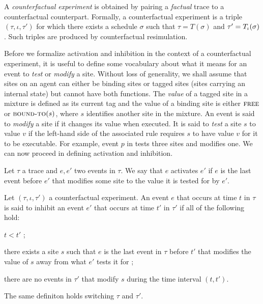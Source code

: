 A \textit{counterfactual experiment} is obtained by pairing a
\emph{factual} trace to a counterfactual counterpart. Formally, a
counterfactual experiment is a triple $(\tau, \iota, \tau')$ for which
there exists a schedule $\sigma$ such that $\tau = T(\sigma)$ and
$\tau' = {T_\iota}{}(\sigma)$. Such triples are produced by
counterfactual resimulation.

Before we formalize activation and inhibition in the context of a
counterfactual experiment, it is useful to define some vocabulary
about what it means for an event to \emph{test} or \emph{modify} a
site. Without loss of generality, we shall assume that sites on an
agent can either be binding sites or tagged sites (sites carrying an
internal state) but cannot have both functions. The \textit{value} of
a tagged site in a mixture is defined as its current tag and the value
of a binding site is either $\textsc{free}$ or $\textsc{bound-to}(s)$,
where $s$ identifies another site in the mixture.  An event is said to
\emph{modify} a site if it changes its value when executed. It is said
to \emph{test} a site $s$ to value $v$ if the left-hand side of the
associated rule requires $s$ to have value $v$ for it to be
executable. For example, event $p$ in \RefTrace{} tests three sites
and modifies one. We can now proceed in defining activation and inhibition.



\begin{definition}[Activation]
  Let $\tau$ a trace and $e, e'$ two events in $\tau$.  We say that
  $e$ activates $e'$ if $e$ is the last event before $e'$ that
  modifies some site to the value it is tested for by $e'$.
\end{definition}

\begin{definition}[Inhibition]
  Let $(\tau, \iota, \tau')$ a counterfactual experiment. An
  event $e$ that occurs at time $t$ in $\tau$ is said to inhibit an
  event $e'$ that occurs at time $t'$ in $\tau'$ if all of the
  following hold:
  \begin{inparaenum}[(1)]
  \item \label{inhibition:time} $t < t'$ ;
  \item \label{inhibition:breaks} there exists a site $s$ such that
    $e$ is the last event in $\tau$ before $t'$ that modifies the
    value of $s$ away from what $e'$ tests it for ;
  \item \label{inhibition:nointf} there are no events in $\tau'$ that
    modify $s$ during the time interval $(t, t')$.
  \end{inparaenum}
  The same definiton holds switching $\tau$ and $\tau'$.
\end{definition}

